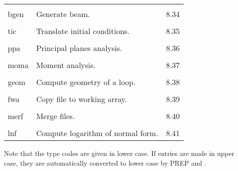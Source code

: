 \begin{center}
\begin{tabular}{lll}
\vspace{-3mm}& &\\
\hspace{1.5em}bgen  &           Generate beam. & \hspace{2em}8.34\\
\vspace{-3mm}& &\\
\hspace{1.5em}tic  &           Translate initial conditions. & \hspace{2em}8.35\\
\vspace{-3mm}& &\\
\hspace{1.5em}ppa  &           Principal planes analysis. & \hspace{2em}8.36\\
\vspace{-3mm}& &\\
\hspace{1.5em}moma  &           Moment analysis. & \hspace{2em}8.37\\
\vspace{-3mm}& &\\
\hspace{1.5em}geom   &          Compute geometry of a loop. & \hspace{2em}8.38\\
\vspace{-3mm}& &\\
\hspace{1.5em}fwa      &          Copy file to working array.   &
\hspace{2em}8.39\\
\vspace{-3mm}& &\\
\hspace{1.5em}merf      &        Merge files.   &
\hspace{2em}8.40\\
\vspace{-3mm}& &\\
\hspace{1.5em}lnf      &        Compute logarithm of normal form.   &
\hspace{2em}8.41
\end{tabular}
\end{center}
Note that the type codes are given in lower case.  If entries are made in
upper case, they are automatically converted to lower case by PREP and
\Maryend.


